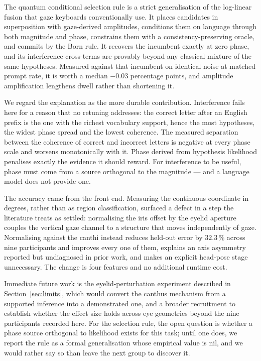 \documentclass[conference]{IEEEtran}
\begin{document}
The quantum conditional selection rule is a strict generalisation of the
log-linear fusion that gaze keyboards conventionally use. It places candidates
in superposition with gaze-derived amplitudes, conditions them on language
through both magnitude and phase, constrains them with a consistency-preserving
oracle, and commits by the Born rule. It recovers the incumbent exactly at zero
phase, and its interference cross-terms are provably beyond any classical
mixture of the same hypotheses. Measured against that incumbent on identical
noise at matched prompt rate, it is worth a median $-0.03$ percentage points,
and amplitude amplification lengthens dwell rather than shortening it.

We regard the explanation as the more durable contribution. Interference fails
here for a reason that no retuning addresses: the correct letter after an
English prefix is the one with the richest vocabulary support, hence the most
hypotheses, the widest phase spread and the lowest coherence. The measured
separation between the coherence of correct and incorrect letters is negative at
every phase scale and worsens monotonically with it. Phase derived from
hypothesis likelihood penalises exactly the evidence it should reward. For
interference to be useful, phase must come from a source orthogonal to the
magnitude --- and a language model does not provide one.

The accuracy came from the front end. Measuring the continuous coordinate in
degrees, rather than as region classification, surfaced a defect in a step the
literature treats as settled: normalising the iris offset by the eyelid aperture
couples the vertical gaze channel to a structure that moves independently of
gaze. Normalising against the canthi instead reduces held-out error by
$32.3\,\%$ across nine participants and improves every one of them, explains an
axis asymmetry reported
but undiagnosed in prior work, and makes an explicit head-pose stage
unnecessary. The change is four features and no additional runtime cost. 

Immediate future work is the eyelid-perturbation experiment described in
Section~\ref{sec:limits}, which would convert the canthus mechanism from a
supported inference into a demonstrated one, and a broader recruitment to
establish whether the effect size holds across eye geometries beyond the nine
participants recorded here. For the selection
rule, the open question is whether a phase source orthogonal to likelihood
exists for this task; until one does, we report the rule as a formal
generalisation whose empirical value is nil, and we would rather say so than
leave the next group to discover it.
\end{document}
